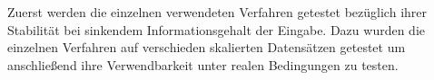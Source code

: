 Zuerst werden die einzelnen verwendeten Verfahren getestet bezüglich ihrer Stabilität bei sinkendem Informationsgehalt der Eingabe. Dazu wurden die einzelnen Verfahren auf verschieden skalierten Datensätzen getestet um anschließend ihre Verwendbarkeit unter realen Bedingungen zu testen.